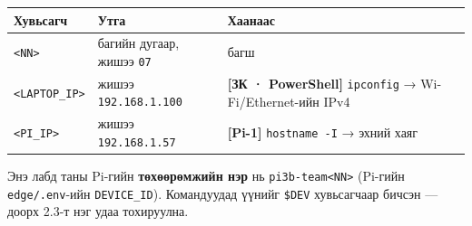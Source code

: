 \begingroup\scriptsize\begin{longtable}[]{@{}lll@{}}
\toprule
\begin{minipage}[b]{0.30\columnwidth}\raggedright
Хувьсагч\strut
\end{minipage} & \begin{minipage}[b]{0.30\columnwidth}\raggedright
Утга\strut
\end{minipage} & \begin{minipage}[b]{0.30\columnwidth}\raggedright
Хаанаас\strut
\end{minipage}\tabularnewline
\midrule
\endhead
\begin{minipage}[t]{0.30\columnwidth}\raggedright
\texttt{\textless{}NN\textgreater{}}\strut
\end{minipage} & \begin{minipage}[t]{0.30\columnwidth}\raggedright
багийн дугаар, жишээ \texttt{07}\strut
\end{minipage} & \begin{minipage}[t]{0.30\columnwidth}\raggedright
багш\strut
\end{minipage}\tabularnewline
\begin{minipage}[t]{0.30\columnwidth}\raggedright
\texttt{\textless{}LAPTOP\_\allowbreak{}IP\textgreater{}}\strut
\end{minipage} & \begin{minipage}[t]{0.30\columnwidth}\raggedright
жишээ \texttt{192.168.1.100}\strut
\end{minipage} & \begin{minipage}[t]{0.30\columnwidth}\raggedright
\textbf{{[}ЗК · PowerShell{]}} \texttt{ipconfig} → Wi-Fi/Ethernet-ийн IPv4\strut
\end{minipage}\tabularnewline
\begin{minipage}[t]{0.30\columnwidth}\raggedright
\texttt{\textless{}PI\_\allowbreak{}IP\textgreater{}}\strut
\end{minipage} & \begin{minipage}[t]{0.30\columnwidth}\raggedright
жишээ \texttt{192.168.1.57}\strut
\end{minipage} & \begin{minipage}[t]{0.30\columnwidth}\raggedright
\textbf{{[}Pi-1{]}} \texttt{hostname\ -I} → эхний хаяг\strut
\end{minipage}\tabularnewline
\bottomrule
\end{longtable}\endgroup

Энэ лабд таны Pi-гийн \textbf{төхөөрөмжийн нэр} нь \texttt{pi3b-team\textless{}NN\textgreater{}} (Pi-гийн \texttt{edge/.env}-ийн \texttt{DEVICE\_ID}). Командуудад үүнийг \texttt{\$DEV} хувьсагчаар бичсэн --- доорх 2.3-т нэг удаа тохируулна.

